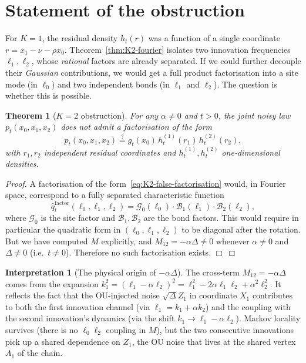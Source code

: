 \documentclass[11pt,a4paper,openany]{book}
\theoremstyle{plainserif}
\newtheorem{theorem}{Theorem}[chapter]
\theoremstyle{definition}
\theoremstyle{remarkstyle}
\newtheorem*{interpretation}{Interpretation}
\newcommand{\hatfn}[1]{\widehat{#1}}
\begin{document}
\section{Statement of the obstruction}

For $K=1$, the residual density $h_t(r)$ was a function of a single
coordinate $r = x_1 - \nu - \rho x_0$. Theorem~\ref{thm:K2-fourier}
isolates two innovation frequencies $\ell_1, \ell_2$, whose
\emph{rational} factors are already separated. If we could further
decouple their \emph{Gaussian} contributions, we would get a full
product factorisation into a site mode (in $\ell_0$) and two independent
bonds (in $\ell_1$ and $\ell_2$). The question is whether this is
possible.

\begin{theorem}[$K{=}2$ obstruction]
\label{thm:K2-obstruction}
For any $\alpha \neq 0$ and $t > 0$, the joint noisy law
$p_t(x_0, x_1, x_2)$ does not admit a factorisation of the form
\begin{equation}
p_t(x_0, x_1, x_2) \stackrel{?}{=} g_t(x_0)\, h_t^{(1)}(r_1)\, h_t^{(2)}(r_2),
\label{eq:K2-false-factorisation}
\end{equation}
with $r_1, r_2$ independent residual coordinates and
$h_t^{(1)}, h_t^{(2)}$ one-dimensional densities.
\end{theorem}

\begin{proof}
A factorisation of the form~\eqref{eq:K2-false-factorisation} would, in
Fourier space, correspond to a fully separated characteristic function
\[
\hatfn q_t^{\text{factor}}(\ell_0, \ell_1, \ell_2) =
  \mathcal G_0(\ell_0) \cdot \mathcal B_1(\ell_1) \cdot \mathcal B_2(\ell_2),
\]
where $\mathcal G_0$ is the site factor and $\mathcal B_1, \mathcal B_2$
are the bond factors. This would require in particular the quadratic
form in $(\ell_0, \ell_1, \ell_2)$ to be diagonal after the rotation.
But we have computed $M$ explicitly, and $M_{12} = -\alpha\Delta \neq 0$
whenever $\alpha \neq 0$ and $\Delta \neq 0$ (i.e.\ $t \neq 0$).
Therefore no such factorisation exists. $\Box$
\end{proof}

\begin{interpretation}[The physical origin of $-\alpha\Delta$]
The cross-term $M_{12} = -\alpha\Delta$ comes from the expansion
$k_1^2 = (\ell_1 - \alpha\ell_2)^2 = \ell_1^2 - 2\alpha\ell_1\ell_2 + \alpha^2\ell_2^2$.
It reflects the fact that the OU-injected noise $\sqrt{\Delta}Z_1$ in
coordinate $X_1$ contributes to both the first innovation channel (via
$\ell_1 = k_1 + \alpha k_2$) and the coupling with the second
innovation's dynamics (via the shift $k_1 \to \ell_1 - \alpha\ell_2$).
Markov locality survives (there is no $\ell_0\ell_2$ coupling in $M$),
but the two consecutive innovations pick up a shared dependence on
$Z_1$, the OU noise that lives at the shared vertex $A_1$ of the chain.
\end{interpretation}
\end{document}
